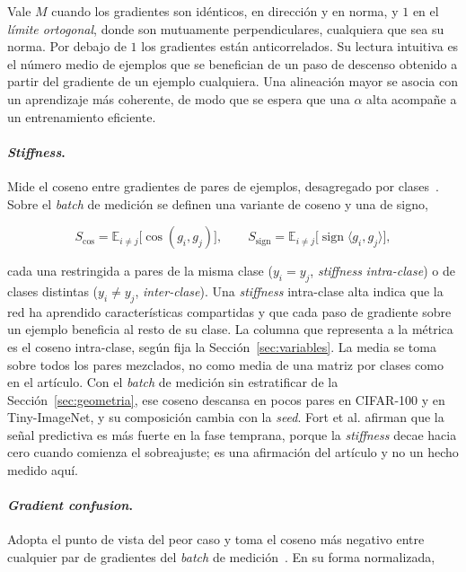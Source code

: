Vale $M$ cuando los gradientes son idénticos, en dirección y en norma, y $1$ en el \emph{límite ortogonal}, donde son mutuamente perpendiculares, cualquiera que sea su norma. Por debajo de $1$ los gradientes están anticorrelados. Su lectura intuitiva es el número medio de ejemplos que se benefician de un paso de descenso obtenido a partir del gradiente de un ejemplo cualquiera. Una alineación mayor se asocia con un aprendizaje más coherente, de modo que se espera que una $\alpha$ alta acompañe a un entrenamiento eficiente.

\paragraph{\emph{Stiffness}.} Mide el coseno entre gradientes de pares de ejemplos, desagregado
por clases~\cite{fort2019stiffness}. Sobre el \emph{batch} de medición se definen una variante de coseno y una de signo,

\begin{equation}
S_{\cos} = \mathbb{E}_{i \neq j}\!\big[\cos(g_i, g_j)\big],
\qquad
S_{\operatorname{sign}} = \mathbb{E}_{i \neq j}\!\big[\operatorname{sign}\langle g_i, g_j\rangle\big],
\label{eq:stiffness}
\end{equation}

cada una restringida a pares de la misma clase ($y_i = y_j$, \emph{stiffness} \emph{intra-clase}) o de clases distintas ($y_i \neq y_j$, \emph{inter-clase}). Una \emph{stiffness} intra-clase alta indica que la red ha aprendido características compartidas y que cada paso de gradiente sobre un ejemplo beneficia al resto de su clase. La columna que representa a la métrica es el coseno intra-clase, según fija la Sección~\ref{sec:variables}. La media se toma sobre todos los pares mezclados, no como media de una matriz por clases como en el artículo. Con el \emph{batch} de medición sin estratificar de la Sección~\ref{sec:geometria}, ese coseno descansa en pocos pares en CIFAR-100 y en Tiny-ImageNet, y su composición cambia con la \emph{seed}. Fort et al. afirman que la señal predictiva es más fuerte en la fase temprana, porque la \emph{stiffness} decae hacia cero cuando comienza el sobreajuste; es una afirmación del artículo y no un hecho medido aquí.

\paragraph{\emph{Gradient confusion}.} Adopta el punto de vista del peor caso y toma el coseno más
negativo entre cualquier par de gradientes del \emph{batch} de medición~\cite{sankararaman2020impact}. En su forma normalizada,

